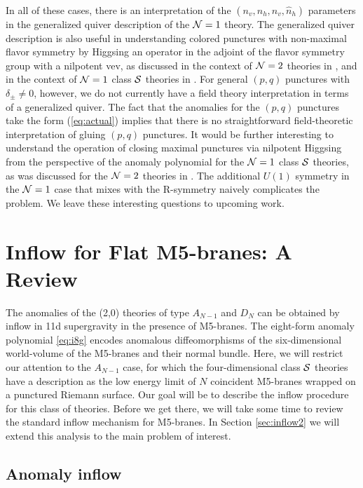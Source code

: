 \documentclass[a4paper,11pt]{article}
\def\CN{{\cal N}}
\def\CS{{\cal S}}
\begin{document}
In all of these cases, there is an interpretation of the $(n_v,n_h,\hat{n}_v,\hat{n}_h)$ parameters in the generalized quiver description of the $\CN=1$ theory. The generalized quiver description is also useful in understanding colored punctures with non-maximal flavor symmetry by Higgsing an operator in the adjoint of the flavor symmetry group with a nilpotent vev, as discussed in the context of $\CN=2$ theories in \cite{Tachikawa:2013kta}, and in the context of $\CN=1$ class $\CS$ theories in \cite{Agarwal:2014rua}. For general $(p,q)$ punctures with $\delta_\pm\neq0$, however, we do not currently have a field theory interpretation in terms of a generalized quiver. The fact that the anomalies for the $(p,q)$ punctures take the form (\ref{eq:actual}) implies that there is no straightforward field-theoretic interpretation of gluing $(p,q)$ punctures. It would be further interesting to understand the operation of closing maximal punctures via nilpotent Higgsing from the perspective of the anomaly polynomial for the $\CN=1$ class $\CS$ theories, as was discussed for the $\CN=2$ theories in \cite{Tachikawa:2015bga}. The additional $U(1)$ symmetry in the $\CN=1$ case that mixes with the R-symmetry naively complicates the problem. We leave these interesting questions to upcoming work.
	


\section{Inflow for Flat M5-branes: A Review} \label{sec:inflow1}

The anomalies of the (2,0) theories of type $A_{N-1}$ and $D_N$ can be obtained by inflow in 11d supergravity in the presence of M5-branes. The eight-form anomaly polynomial \eqref{eq:i8g} encodes anomalous diffeomorphisms of the six-dimensional world-volume of the M5-branes and their normal bundle.  Here, we will restrict our attention to the $A_{N-1}$ case, for which the four-dimensional class $\CS$ theories have a description as the low energy limit of $N$ coincident M5-branes wrapped on a punctured Riemann surface. Our goal will be to describe the inflow procedure for this class of theories. Before we get there, we will take some time to review the standard inflow mechanism for M5-branes. In Section \ref{sec:inflow2} we will extend this analysis to the main problem of interest.

\subsection{Anomaly inflow}\label{sec:inflow}%
\end{document}
